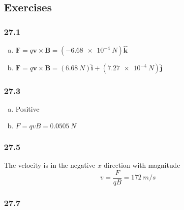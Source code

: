 \documentclass{article}
\begin{document}
\subsection{Exercises}

\subsubsection{27.1}

\begin{enumerate}[(a)]
  \item $\mathbf{F} = q \mathbf{v} \times \mathbf{B} = (\qty{-6.68e-4}{N}) \hat{\mathbf{k}}$

  \item $\mathbf{F} = q \mathbf{v} \times \mathbf{B} = (\qty{6.68}{N}) \hat{\mathbf{i}} + (\qty{7.27e-4}{N}) \hat{\mathbf{j}}$
\end{enumerate}

\subsubsection{27.3}

\begin{enumerate}[(a)]
  \item Positive

  \item $F = q v B = \qty{0.0505}{N}$
\end{enumerate}

\subsubsection{27.5}

The velocity is in the negative $x$ direction with magnitude \[v = \frac{F}{q B} = \qty{172}{m/s}\]

\subsubsection{27.7}
\end{document}
